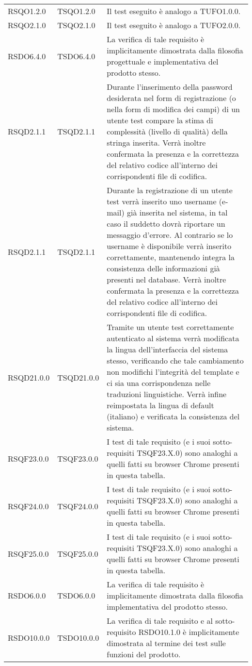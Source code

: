 \begin{center}
\begin{longtable}{llp{}}
RSQO1.2.0 &TSQO1.2.0& Il test eseguito è analogo a TUFO1.0.0.\\
RSQO2.1.0 &TSQO2.1.0& Il test eseguito è analogo a TUFO2.0.0.\\
RSDO6.4.0 & TSDO6.4.0& La verifica di tale requisito è implicitamente dimostrata dalla filosofia progettuale e implementativa del prodotto stesso.\\
RSQD2.1.1 &TSQD2.1.1& Durante l'inserimento della password desiderata nel form di registrazione (o nella form di modifica dei campi) di un utente test compare la stima di complessità (livello di qualità) della stringa inserita. Verrà inoltre confermata la presenza e la correttezza  del relativo codice all'interno dei corrispondenti file di codifica.\\
RSQD2.1.1 &TSQD2.1.1& Durante la registrazione di un utente test verrà inserito uno username (e-mail) già inserita nel sistema, in tal caso il suddetto dovrà riportare un messaggio d'errore. Al contrario se lo username è disponibile verrà inserito correttamente, mantenendo integra la consistenza delle informazioni già presenti nel database. Verrà inoltre confermata la presenza e la correttezza  del relativo codice all'interno dei corrispondenti file di codifica.\\
RSQD21.0.0 & TSQD21.0.0 & Tramite un utente test correttamente autenticato al sistema verrà modificata la lingua dell'interfaccia del sistema stesso, verificando che tale cambiamento non modifichi l'integrità del template e ci sia una corrispondenza nelle traduzioni linguistiche. Verrà infine reimpostata la lingua di default (italiano) e verificata la consistenza del sistema.\\
RSQF23.0.0  & TSQF23.0.0 & I test di tale requisito (e i suoi sotto-requisiti TSQF23.X.0) sono analoghi a quelli fatti su browser Chrome presenti in questa tabella.\\
RSQF24.0.0 & TSQF24.0.0 & I test di tale requisito (e i suoi sotto-requisiti TSQF23.X.0) sono analoghi a quelli fatti su browser Chrome presenti in questa tabella.\\
RSQF25.0.0 & TSQF25.0.0 &I  test di tale requisito (e i suoi sotto-requisiti TSQF23.X.0) sono analoghi a quelli fatti su browser Chrome presenti in questa tabella.\\
RSDO6.0.0 & TSDO6.0.0 & La verifica di tale requisito è implicitamente dimostrata dalla filosofia implementativa del prodotto stesso.\\
RSDO10.0.0 & TSDO10.0.0 & La verifica di tale requisito e al sotto-requisito RSDO10.1.0 è implicitamente dimostrata al termine dei test sulle funzioni del prodotto.\\

\end{longtable}
\end{center}
